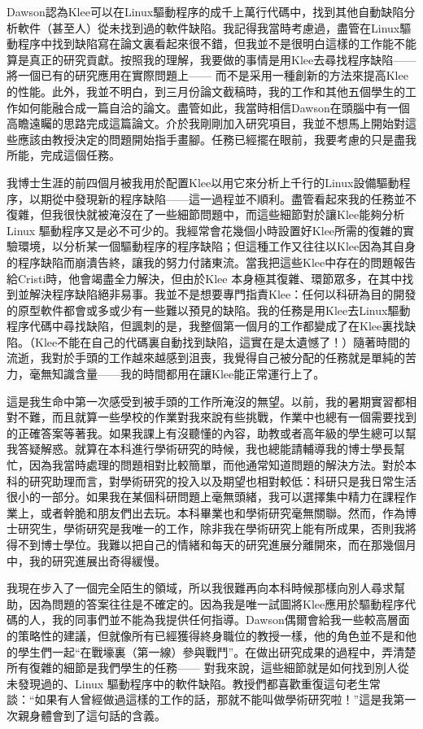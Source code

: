 \documentclass[12pt,UTF8,nofonts]{book}
\begin{document}
Dawson認為Klee可以在Linux驅動程序的成千上萬行代碼中，找到其他自動缺陷分析軟件（甚至人）從未找到過的軟件缺陷。我記得我當時考慮過，盡管在Linux驅動程序中找到缺陷寫在論文裏看起來很不錯，但我並不是很明白這樣的工作能不能算是真正的研究貢獻。按照我的理解，我要做的事情是用Klee去尋找程序缺陷—— 將一個已有的研究應用在實際問題上—— 而不是采用一種創新的方法來提高Klee的性能。此外，我並不明白，到三月份論文截稿時，我的工作和其他五個學生的工作如何能融合成一篇自洽的論文。盡管如此，我當時相信Dawson在頭腦中有一個高瞻遠矚的思路完成這篇論文。介於我剛剛加入研究項目，我並不想馬上開始對這些應該由教授決定的問題開始指手畫腳。任務已經擺在眼前，我要考慮的只是盡我所能，完成這個任務。

\breakline

我博士生涯的前四個月被我用於配置Klee以用它來分析上千行的Linux設備驅動程序，以期從中發現新的程序缺陷——這一過程並不順利。盡管看起來我的任務並不復雜，但我很快就被淹沒在了一些細節問題中，而這些細節對於讓Klee能夠分析Linux 驅動程序又是必不可少的。我經常會花幾個小時設置好Klee所需的復雜的實驗環境，以分析某一個驅動程序的程序缺陷；但這種工作又往往以Klee因為其自身的程序缺陷而崩潰告終，讓我的努力付諸東流。當我把這些Klee中存在的問題報告給Cristi時，他會竭盡全力解決，但由於Klee 本身極其復雜、環節眾多，在其中找到並解決程序缺陷絕非易事。我並不是想要專門指責Klee：任何以科研為目的開發的原型軟件都會或多或少有一些難以預見的缺陷。我的任務是用Klee去Linux驅動程序代碼中尋找缺陷，但諷刺的是，我整個第一個月的工作都變成了在Klee裏找缺陷。（Klee不能在自己的代碼裏自動找到缺陷，這實在是太遺憾了！）隨著時間的流逝，我對於手頭的工作越來越感到沮喪，我覺得自己被分配的任務就是單純的苦力，毫無知識含量——我的時間都用在讓Klee能正常運行上了。

這是我生命中第一次感受到被手頭的工作所淹沒的無望。以前，我的暑期實習都相對不難，而且就算一些學校的作業對我來說有些挑戰，作業中也總有一個需要找到的正確答案等著我。如果我課上有沒聽懂的內容，助教或者高年級的學生總可以幫我答疑解惑。就算在本科進行學術研究的時候，我也總能請輔導我的博士學長幫忙，因為我當時處理的問題相對比較簡單，而他通常知道問題的解決方法。對於本科的研究助理而言，對學術研究的投入以及期望也相對較低：科研只是我日常生活很小的一部分。如果我在某個科研問題上毫無頭緒，我可以選擇集中精力在課程作業上，或者幹脆和朋友們出去玩。本科畢業也和學術研究毫無關聯。然而，作為博士研究生，學術研究是我唯一的工作，除非我在學術研究上能有所成果，否則我將得不到博士學位。我難以把自己的情緒和每天的研究進展分離開來，而在那幾個月中，我的研究進展出奇得緩慢。

我現在步入了一個完全陌生的領域，所以我很難再向本科時候那樣向別人尋求幫助，因為問題的答案往往是不確定的。因為我是唯一試圖將Klee應用於驅動程序代碼的人，我的同事們並不能為我提供任何指導。Dawson偶爾會給我一些較高層面的策略性的建議，但就像所有已經獲得終身職位的教授一樣，他的角色並不是和他的學生們一起“在戰壕裏（第一線）參與戰鬥”。在做出研究成果的過程中，弄清楚所有復雜的細節是我們學生的任務—— 對我來說，這些細節就是如何找到別人從未發現過的、Linux 驅動程序中的軟件缺陷。教授們都喜歡重復這句老生常談：“如果有人曾經做過這樣的工作的話，那就不能叫做學術研究啦！”這是我第一次親身體會到了這句話的含義。
\end{document}
